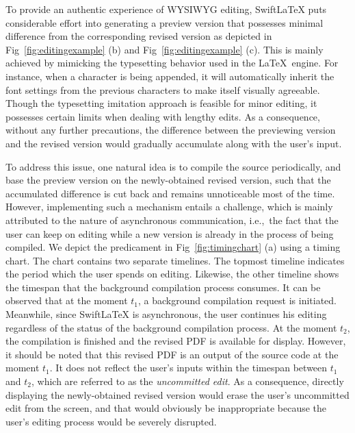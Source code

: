 \documentclass[sigconf]{acmart}
\newcommand{\ie}{i.e.,\ }
\begin{document}

To provide an authentic experience of WYSIWYG editing, SwiftLaTeX puts considerable effort into generating a preview version that possesses minimal difference from the corresponding revised version as depicted in Fig~\ref{fig:editingexample} (b) and Fig~\ref{fig:editingexample} (c).
This is mainly achieved by mimicking the typesetting behavior used in the \LaTeX\ engine. 
For instance, when a character is being appended, it will automatically inherit the font settings from the previous characters to make itself visually agreeable.
Though the typesetting imitation approach is feasible for minor editing, it possesses certain limits when dealing with lengthy edits.
As a consequence, without any further precautions, the difference between the previewing version and the revised version would gradually accumulate along with the user's input.

To address this issue, one natural idea is to  compile the source periodically, and base the preview version on the newly-obtained revised version, such that the accumulated difference is cut back and remains unnoticeable most of the time. However, implementing such a mechanism entails a challenge, which is mainly attributed to the nature of asynchronous communication, \ie the fact that the user can keep on editing while a new version is already in the process of being compiled. 
We depict the predicament in Fig~\ref{fig:timingchart} (a) using a timing chart.
The chart contains two separate timelines. 
The topmost timeline indicates the period which the user spends on editing.
Likewise, the other timeline shows the timespan that the background compilation process consumes.
It can be observed that at the moment $t_1$, a background compilation request is initiated.
Meanwhile, since SwiftLaTeX is asynchronous, the user continues his editing regardless of the status of the background compilation process.
At the moment $t_2$, the compilation is finished and the revised PDF is available for display.
However, it should be noted that this revised PDF is an output of the source code at the moment $t_1$. 
It does not reflect the user's inputs within the timespan between $t_1$ and $t_2$, which are referred to as the \textit{uncommitted edit}.
As a consequence, directly displaying the newly-obtained revised version would erase the user's uncommitted edit  from the screen, and that would  obviously be inappropriate because the user's editing process would be severely disrupted.
\end{document}
